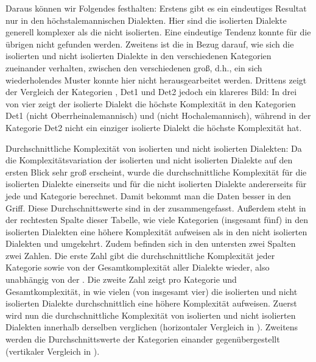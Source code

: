 Daraus können wir Folgendes festhalten: Erstens gibt es ein eindeutiges Resultat nur in den höchstalemannischen Dialekten. Hier sind die isolierten Dialekte generell komplexer als die nicht isolierten. Eine eindeutige Tendenz konnte für die übrigen  nicht gefunden werden. Zweitens ist die  in Bezug darauf, wie sich die isolierten und nicht isolierten Dialekte in den verschiedenen Kategorien zueinander verhalten, zwischen den verschiedenen  groß, d.h., ein sich wiederholendes Muster konnte hier nicht herausgearbeitet werden. Drittens zeigt der Vergleich der Kategorien , Det1 und Det2 jedoch ein klareres Bild: In drei von vier  zeigt der isolierte Dialekt die höchste Komplexität in den Kategorien Det1 (nicht Oberrheinalemannisch) und  (nicht Hochalemannisch), während in der Kategorie Det2 nicht ein einziger isolierte Dialekt die höchste Komplexität hat.

{Durchschnittliche Komplexität von isolierten und nicht isolierten Dialekten:} Da die Komplexitätsvariation der isolierten und nicht isolierten Dialekte auf den ersten Blick sehr groß erscheint, wurde die durchschnittliche Komplexität für die isolierten Dialekte einerseits und für die nicht isolierten Dialekte andererseits für jede  und Kategorie berechnet. Damit bekommt man die Daten besser in den Griff. Diese Durchschnittswerte sind in der  zusammengefasst. Außerdem steht in der rechtesten Spalte dieser Tabelle, wie viele Kategorien (insgesamt fünf) in den isolierten Dialekten eine höhere Komplexität aufweisen als in den nicht isolierten Dialekten und umgekehrt. Zudem befinden sich in den untersten zwei Spalten zwei Zahlen. Die erste Zahl gibt die durchschnittliche Komplexität jeder Kategorie sowie von der Gesamtkomplexität aller Dialekte wieder, also unabhängig von der . Die zweite Zahl zeigt pro Kategorie und Gesamtkomplexität, in wie vielen  (von insgesamt vier) die isolierten und nicht isolierten Dialekte durchschnittlich eine höhere Komplexität aufweisen. Zuerst wird nun die durchschnittliche Komplexität von isolierten und nicht isolierten Dialekten innerhalb derselben  verglichen (horizontaler Vergleich in ). Zweitens werden die Durchschnittswerte der Kategorien einander gegenübergestellt (vertikaler Vergleich in ).

